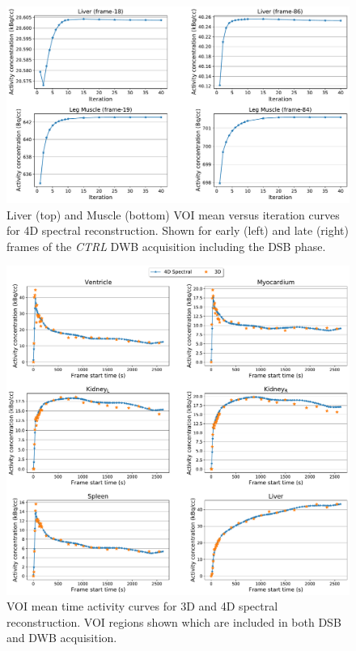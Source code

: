\begin{figure} [h!]
\centering
\includegraphics[scale=0.5,angle=0]{3_Results/3_3_DWB_Reconstruction/figures/3_3_IsotoPK_CTRL_DWB_4D_Convergence.pdf}
\caption{Liver (top) and Muscle (bottom) VOI mean versus iteration curves for 4D spectral reconstruction. Shown for early (left) and late (right) frames of the \textit{CTRL} DWB acquisition including the DSB phase.}
\label{fig_3_3:IsotoPK_CTRL_DSB_4D_Convergence}
\end{figure} 

\begin{figure} [h!]
\centering
\includegraphics[scale=0.5,angle=0]{3_Results/3_3_DWB_Reconstruction/figures/3_3_IsotoPK_CTRL_DWB_3D_vs_4D_central.pdf}
\caption{VOI mean time activity curves for 3D and 4D spectral reconstruction. VOI regions shown which are included in both DSB and DWB acquisition.}
\label{fig_3_3:IsotoPK_CTRL_DWB_4D_vs_3D_Central}
\end{figure} 

